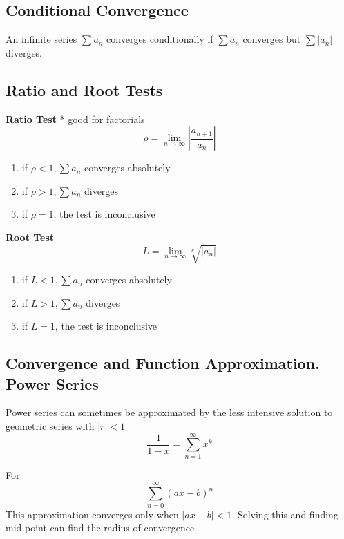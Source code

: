 \subsection{Conditional Convergence}
An infinite series $\sum a_{n}$ converges conditionally if $\sum a_{n}$ converges but $\sum |a_{n}|$ diverges.


\subsection{Ratio and Root Tests}
\textbf{Ratio Test} * good for factorials
\begin{equation}
	\label{}
	\rho=\lim_{n\to\infty}|\frac{a_{n+1}}{a_{n}}|	
\end{equation}

\begin{enumerate}
	\item if $\rho<1, \sum a_{n}$ converges absolutely
	\item if $\rho>1,\sum a_{n}$ diverges
	\item if $\rho=1$, the test is inconclusive
\end{enumerate}
\textbf{Root Test}
\begin{equation}
	\label{}
	L=\lim_{n\to\infty}\sqrt[k]{|a_{n}|}
\end{equation}


\begin{enumerate}
	\item if $L<1, \sum a_{n}$ converges absolutely
	\item if $L>1,\sum a_{n}$ diverges
	\item if $L=1$, the test is inconclusive
\end{enumerate}

\subsection{Convergence and Function Approximation. Power Series}
Power series can sometimes be approximated by the less intensive solution to geometric series with $|r|<1$
\begin{equation}
	\label{}
\frac{1}{1-x}=\sum_{n=1}^{\infty} x^{k}
\end{equation}

For
\begin{equation}
	\label{}
	\sum_{n=0}^{\infty}{(ax-b)}^{n}	
\end{equation}
This approximation converges only when $|ax-b|<1$. Solving this and finding mid point can find the radius of convergence

